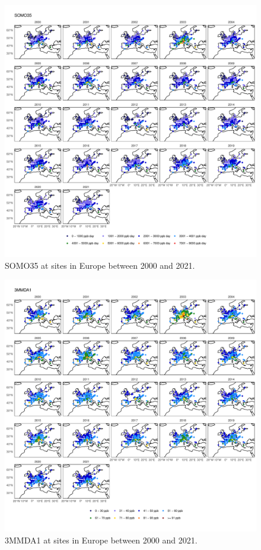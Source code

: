\documentclass{article}
\begin{document}
\begin{figure}
\centering
\includegraphics[height=0.9\textheight]{figures/si_figures/fS12_metric_map_Europe_SOMO35.pdf}
\caption{SOMO35 at sites in Europe between 2000 and 2021.}
\label{si_fig:metric_map_eu_SOMO35}
\end{figure}
\clearpage

\begin{figure}
\centering
\includegraphics[height=0.9\textheight]{figures/si_figures/fS13_metric_map_Europe_3MMDA1.pdf}
\caption{3MMDA1 at sites in Europe between 2000 and 2021.}
\label{si_fig:metric_map_eu_3MMDA1}
\end{figure}
\clearpage
\end{document}
